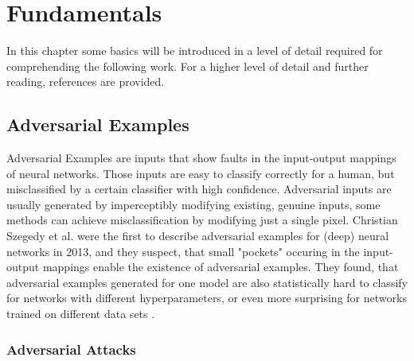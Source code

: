 \documentclass[draft,final]{vutinfth} %
\begin{document}
\chapter{Fundamentals}

In this chapter some basics will be introduced in a level of detail required for comprehending the following work.
For a higher level of detail and further reading, references are provided.

\section{Adversarial Examples}

Adversarial Examples are inputs that show faults in the input-output mappings of neural networks.
Those inputs are easy to classify correctly for a human, but misclassified by a certain classifier with high confidence.
Adversarial inputs are usually generated by imperceptibly modifying existing, genuine inputs, some methods can achieve misclassification by modifying just a single pixel. %
Christian Szegedy et al. were the first to describe adversarial examples for (deep) neural networks in 2013, and they suspect, that small "pockets" occuring in the input-output mappings enable the existence of adversarial examples.
They found, that adversarial examples generated for one model are also statistically hard to classify for networks with different hyperparameters, or even more surprising for networks trained on different data sets \cite{Szegedy2013}.

\subsection{Adversarial Attacks}
\end{document}
